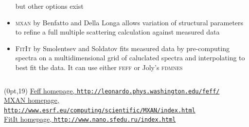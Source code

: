 \documentclass[10pt, xcolor=x11names, compress]{beamer}
\begin{document}
\begin{frame}
\begin{columns}
\begin{column}{0.5\linewidth}
\begin{itemize}
        but other options exist
      \item \textsc{mxan} by Benfatto and Della Longa allows variation
        of structural parameters to refine a full multiple scattering
        calculation against measured data
      \item \textsc{FitIt} by Smolentsev and Soldatov fits measured
        data by pre-computing spectra on a multidimensional grid of
        caluclated spectra and interpolating to best fit the data.  It
        can use either \textsc{feff} or Joly's \textsc{fdmnes}
      \end{itemize}

    \end{column}
  \end{columns}

  \begin{textblock*}{0.7\linewidth}(0pt,19\TPVertModule)%
    \tiny%
    \href{http://leonardo.phys.washington.edu/feff/}
    {\color{Blue4}Feff homepage, \texttt{http://leonardo.phys.washington.edu/feff/}}%
    \\
    \href{http://www.esrf.eu/computing/scientific/MXAN/index.html}
    {\color{Blue4}MXAN homepage, \texttt{http://www.esrf.eu/computing/scientific/MXAN/index.html}}%
    \\
    \href{http://www.nano.sfedu.ru/index.html} 
    {\color{Blue4}FitIt homepage, \texttt{http://www.nano.sfedu.ru/index.html}}
  \end{textblock*}
\end{frame}
\end{document}
